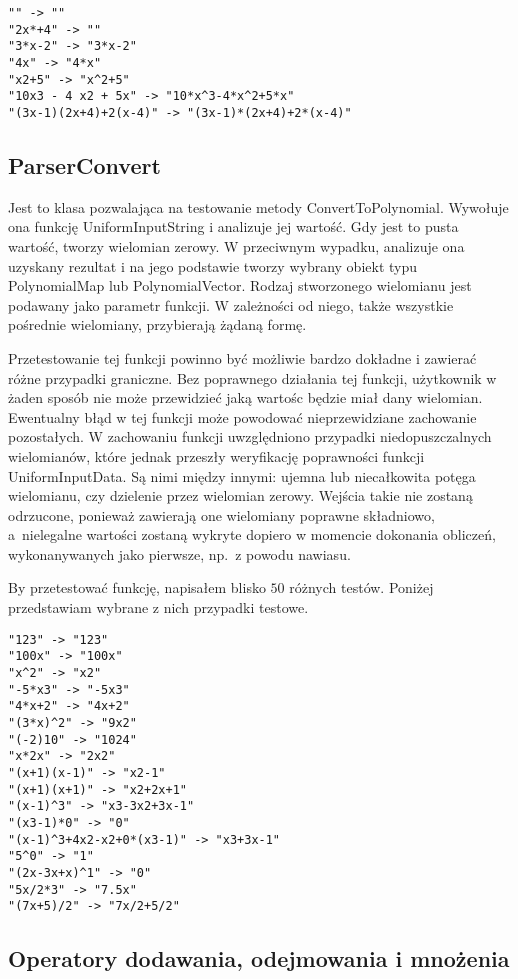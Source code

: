 \begin{lstlisting}
"" -> ""
"2x*+4" -> ""
"3*x-2" -> "3*x-2"
"4x" -> "4*x"
"x2+5" -> "x^2+5"
"10x3 - 4 x2 + 5x" -> "10*x^3-4*x^2+5*x"
"(3x-1)(2x+4)+2(x-4)" -> "(3x-1)*(2x+4)+2*(x-4)"
\end{lstlisting}

\subsection{ParserConvert}

Jest to klasa pozwalająca na testowanie metody ConvertToPolynomial. Wywołuje ona funkcję UniformInputString i analizuje jej wartość. Gdy jest to pusta wartość, tworzy wielomian zerowy. W przeciwnym wypadku, analizuje ona uzyskany rezultat i na jego podstawie tworzy wybrany obiekt typu PolynomialMap lub PolynomialVector. Rodzaj stworzonego wielomianu jest podawany jako parametr funkcji. W zależności od niego, także wszystkie pośrednie wielomiany, przybierają żądaną formę.

Przetestowanie tej funkcji powinno być możliwie bardzo dokładne i zawierać różne przypadki graniczne. Bez poprawnego działania tej funkcji, użytkownik w żaden sposób nie może przewidzieć jaką wartośc będzie miał dany wielomian. Ewentualny błąd w tej funkcji może powodować nieprzewidziane zachowanie pozostałych. W zachowaniu funkcji uwzględniono przypadki niedopuszczalnych wielomianów, które jednak przeszły weryfikację poprawności funkcji UniformInputData. Są nimi między innymi: ujemna lub niecałkowita potęga wielomianu, czy dzielenie przez wielomian zerowy. Wejścia takie nie zostaną odrzucone, ponieważ zawierają one wielomiany poprawne składniowo, a~nielegalne wartości zostaną wykryte dopiero w momencie dokonania obliczeń, wykonanywanych jako pierwsze, np.\ z powodu nawiasu.

By przetestować funkcję, napisałem blisko $50$ różnych testów. Poniżej przedstawiam wybrane z nich przypadki testowe.

\begin{lstlisting}
"123" -> "123"
"100x" -> "100x"
"x^2" -> "x2"
"-5*x3" -> "-5x3"
"4*x+2" -> "4x+2"
"(3*x)^2" -> "9x2"
"(-2)10" -> "1024"
"x*2x" -> "2x2"
"(x+1)(x-1)" -> "x2-1"
"(x+1)(x+1)" -> "x2+2x+1"
"(x-1)^3" -> "x3-3x2+3x-1"
"(x3-1)*0" -> "0"
"(x-1)^3+4x2-x2+0*(x3-1)" -> "x3+3x-1"
"5^0" -> "1"
"(2x-3x+x)^1" -> "0"
"5x/2*3" -> "7.5x"
"(7x+5)/2" -> "7x/2+5/2"
\end{lstlisting}

\subsection{Operatory dodawania, odejmowania i mnożenia}

